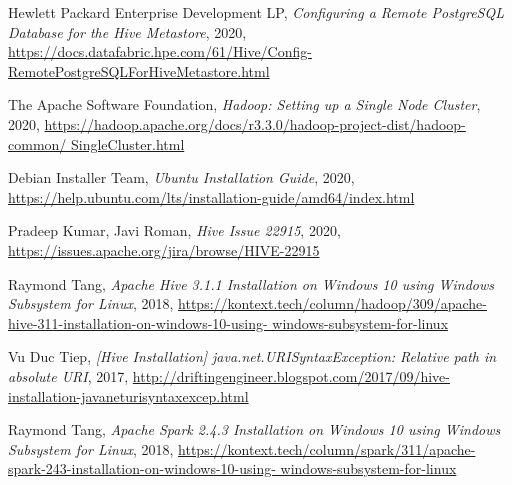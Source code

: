 \documentclass{article}
\begin{document}
\newpage
\begin{thebibliography}{9}
    Hewlett Packard Enterprise Development LP,
    \textit{Configuring a Remote PostgreSQL Database for the Hive Metastore},
    2020,
    \url{https://docs.datafabric.hpe.com/61/Hive/Config-RemotePostgreSQLForHiveMetastore.html}
    
    The Apache Software Foundation,
    \textit{Hadoop: Setting up a Single Node Cluster},
    2020,
    \url{
      https://hadoop.apache.org/docs/r3.3.0/hadoop-project-dist/hadoop-common/
      SingleCluster.html}

    Debian Installer Team,
    \textit{Ubuntu Installation Guide},
    2020,
    \url{https://help.ubuntu.com/lts/installation-guide/amd64/index.html}

    Pradeep Kumar, Javi Roman,
    \textit{Hive Issue 22915},
    2020,
    \url{https://issues.apache.org/jira/browse/HIVE-22915}

    Raymond Tang,
    \textit{Apache Hive 3.1.1 Installation on Windows 10 using Windows Subsystem for Linux},
    2018,
    \url{
      https://kontext.tech/column/hadoop/309/apache-hive-311-installation-on-windows-10-using-
      windows-subsystem-for-linux}

    Vu Duc Tiep,
    \textit{[Hive Installation] java.net.URISyntaxException: Relative path in absolute URI},
    2017,
    \url{http://driftingengineer.blogspot.com/2017/09/hive-installation-javaneturisyntaxexcep.html}

    Raymond Tang,
    \textit{Apache Spark 2.4.3 Installation on Windows 10 using Windows Subsystem for Linux},
    2018,
    \url{
      https://kontext.tech/column/spark/311/apache-spark-243-installation-on-windows-10-using-
      windows-subsystem-for-linux}
\end{thebibliography}
\end{document}
